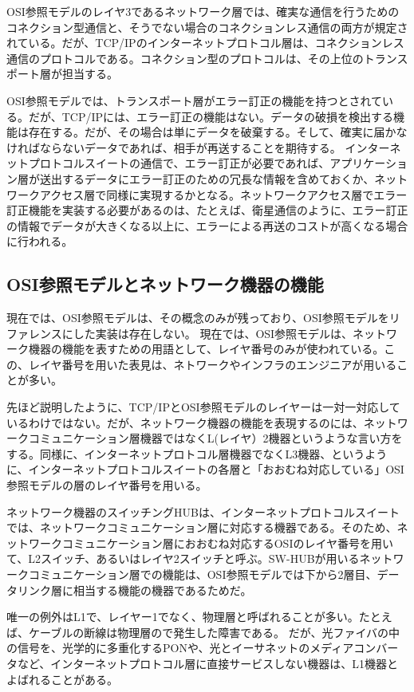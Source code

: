 OSI参照モデルのレイヤ3であるネットワーク層では、確実な通信を行うためのコネクション型通信と、そうでない場合のコネクションレス通信の両方が規定されている。だが、TCP/IPのインターネットプロトコル層は、コネクションレス通信のプロトコルである。コネクション型のプロトコルは、その上位のトランスポート層が担当する。

OSI参照モデルでは、トランスポート層がエラー訂正の機能を持つとされている。だが、TCP/IPには、エラー訂正の機能はない。データの破損を検出する機能は存在する。だが、その場合は単にデータを破棄する。そして、確実に届かなければならないデータであれば、相手が再送することを期待する。
インターネットプロトコルスイートの通信で、エラー訂正が必要であれば、アプリケーション層が送出するデータにエラー訂正のための冗長な情報を含めておくか、ネットワークアクセス層で同様に実現するかとなる。ネットワークアクセス層でエラー訂正機能を実装する必要があるのは、たとえば、衛星通信のように、エラー訂正の情報でデータが大きくなる以上に、エラーによる再送のコストが高くなる場合に行われる。


\subsection{OSI参照モデルとネットワーク機器の機能}
現在では、OSI参照モデルは、その概念のみが残っており、OSI参照モデルをリファレンスにした実装は存在しない。
現在では、OSI参照モデルは、ネットワーク機器の機能を表すための用語として、レイヤ番号のみが使われている。この、レイヤ番号を用いた表見は、ネトワークやインフラのエンジニアが用いることが多い。

先ほど説明したように、TCP/IPとOSI参照モデルのレイヤーは一対一対応しているわけではない。だが、ネットワーク機器の機能を表現するのには、ネットワークコミュニケーション層機器ではなくL(レイヤ）2機器というような言い方をする。同様に、インターネットプロトコル層機器でなくL3機器、というように、インターネットプロトコルスイートの各層と「おおむね対応している」OSI参照モデルの層のレイヤ番号を用いる。

ネットワーク機器のスイッチングHUBは、インターネットプロトコルスイートでは、ネットワークコミュニケーション層に対応する機器である。そのため、ネットワークコミュニケーション層におおむね対応するOSIのレイヤ番号を用いて、L2スイッチ、あるいはレイヤ2スイッチと呼ぶ。SW-HUBが用いるネットワークコミュニケーション層での機能は、OSI参照モデルでは下から2層目、データリンク層に相当する機能の機器であるためだ。

唯一の例外はL1で、レイヤー1でなく、物理層と呼ばれることが多い。たとえば、ケーブルの断線は物理層ので発生した障害である。
だが、光ファイバの中の信号を、光学的に多重化するPONや、光とイーサネットのメディアコンバータなど、インターネットプロトコル層に直接サービスしない機器は、L1機器とよばれることがある。

